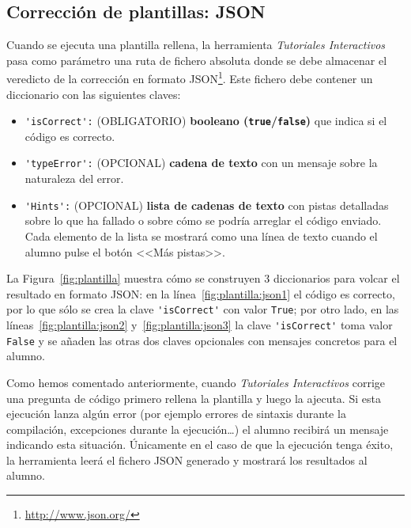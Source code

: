 \documentclass[]{article}
\newcommand{\code}[1]{{\lstinline[basicstyle=\ttfamily,mathescape]!#1!}}
\newcommand{\toolname}{\emph{Tutoriales Interactivos}}
\begin{document}
\subsection{Corrección de plantillas: JSON}
Cuando se ejecuta una plantilla rellena, la herramienta \toolname{} pasa como parámetro una ruta de fichero absoluta donde se debe almacenar el veredicto de la corrección en formato JSON\footnote{\url{http://www.json.org/}}. Este fichero debe contener un diccionario con las siguientes claves:
\begin{itemize}
	\item \code{'isCorrect':} {\sf (OBLIGATORIO)} \textbf{booleano (\code{true}/\code{false})} que indica si el código es correcto.
	\item \code{'typeError':} {\sf (OPCIONAL)} \textbf{cadena de texto} con un mensaje sobre la naturaleza del error. 
	\item \code{'Hints':} {\sf (OPCIONAL)} \textbf{lista de cadenas de texto} con pistas detalladas sobre lo que ha fallado o sobre cómo se podría arreglar el código enviado. Cada elemento de la lista se mostrará como una línea de texto cuando el alumno pulse el botón <<Más pistas>>.
\end{itemize}
La Figura~\ref{fig:plantilla} muestra cómo se construyen 3 diccionarios para volcar el resultado en formato JSON: en la línea~\ref{fig:plantilla:json1} el código es correcto, por lo que sólo se crea la clave \code{'isCorrect'} con valor \code{True}; por otro lado, en las líneas~\ref{fig:plantilla:json2} y~\ref{fig:plantilla:json3} la clave \code{'isCorrect'} toma valor \code{False} y se añaden las otras dos claves opcionales con mensajes concretos para el alumno.

Como hemos comentado anteriormente, cuando \toolname{} corrige una pregunta de código primero rellena la plantilla y luego la ajecuta. Si esta ejecución lanza algún error (por ejemplo errores de sintaxis durante la compilación, excepciones durante la ejecución\ldots) el alumno recibirá un mensaje indicando esta situación. Únicamente en el caso de que la ejecución tenga éxito, la herramienta leerá el fichero JSON generado y mostrará los resultados al alumno.
\end{document}
